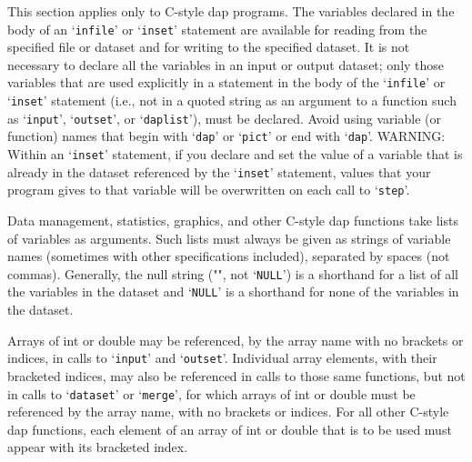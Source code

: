 \documentclass{book}
\renewcommand{\_}{\Texinfounderscore\discretionary{}{}{}}
\begin{document}
This section applies only to C-style dap programs.
The variables declared in the body of an `\texttt{infile}'
%
or `\texttt{inset}'
%
statement
are available for reading from the specified file or dataset and for
writing to the specified dataset.  It is not necessary to
declare
%
all the variables in an input or output dataset; only those variables
that are used explicitly in a statement in the body of the `\texttt{infile}' or `\texttt{inset}'
statement
(i.e., not in a quoted string as an argument to
a function such as `\texttt{input}', `\texttt{outset}', or `\texttt{dap\_list}'),
must be declared.
%
%
%
%
Avoid using variable (or function) names
%
that begin with
`\texttt{dap\_}' or `\texttt{pict\_}' or end with `\texttt{dap\_}'.
WARNING: Within an `\texttt{inset}' statement, if you declare and set the value
of a variable that is already in the dataset
referenced by the `\texttt{inset}' statement, values that your program gives to
that variable will be overwritten on each call to `\texttt{step}'.
%

Data management, statistics, graphics, and other C-style dap functions take lists of variables
as arguments.  Such lists must always be given as strings
%
%
of variable names (sometimes with other specifications included), separated by
spaces (not commas).
%
Generally, the null string ("", not `\texttt{NULL}')
%
is a shorthand
for a list of all the variables in the dataset and `\texttt{NULL}'
%
is a shorthand
for none of the variables in the dataset.

Arrays
%
of int or double may be referenced, by the array name with no brackets or indices,
in calls to `\texttt{input}' and
%
`\texttt{outset}'.
%
Individual array elements, with their bracketed indices,
may also be referenced in calls to those same functions, but not in calls to
`\texttt{dataset}'
%
or `\texttt{merge}',
%
for which arrays of int or double must be referenced by the array name,
with no brackets or indices.
For all other C-style dap functions, each element of an array of
int or double that is to be used must appear with its bracketed index.  
\end{document}
